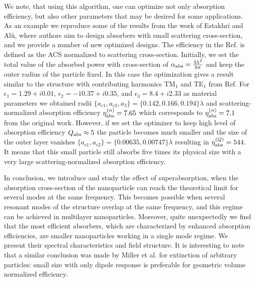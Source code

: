 \documentclass[twoside,twocolumn,9pt]{article}
\begin{document}
We note, that using this algorithm, one can optimize not
only absorption efficiency, but also other parameters that may be
desired for some applications. As an example we reproduce some of the
results from the work of Estakhri and Al\`u,\cite{Alu-2014} where
authors aim to design absorbers with small scattering cross-section,
and we provide a number of new optimized designs. The efficiency in
the Ref.\cite{Alu-2014} is defined as the ACS normalized to
scattering cross-section. Initially, we set the total value of the
absorbed power with cross-section of $\alpha_{\rm
  abs}=\frac{3\lambda^2}{8\pi}$ and keep the outer radius of the
particle fixed. In this case the optimization gives a result similar
to the structure with contributing harmonics TM${_1}$ and TE$_1$ from
Ref.\cite{Alu-2014}  For $\epsilon_1 = 1.29+i0.01$, $\epsilon_2 =
-10.37+ i0.35$, and $\epsilon_3=8.4+i2.33$ as material parameters we
obtained radii $\{a_{c1},a_{c2},a_3\}=\{0.142,0.166,0.194\}\lambda$
and scattering-normalized absorption efficiency $\eta_{\rm
  abs}^{(\alpha)} =7.65$ which corresponds to $\eta_{\rm
  abs}^{(\alpha)} =7.1$ from the original work.\cite{Alu-2014}
However, if we set the optimizer to keep high level of absorption
efficiency $Q_{\rm abs} \approx 5$ the particle becomes much smaller
and the size of the outer layer vanishes
$\{a_{c1},a_{c2}\}=\{0.00635,0.00747\}\lambda$ resulting in $\eta_{\rm
  abs}^{(Q)} =544$.  It means that this small particle still absorbs
five times its physical size with a very large scattering-normalized
absorption efficiency.



In conclusion, we introduce and study the effect of superabsorption,
when the absorption cross-section of the nanoparticle can reach the
theoretical limit for several modes at the same frequency. This
becomes possible when several resonant modes of the structure overlap
at the same frequency, and this regime can be achieved in multilayer
nanoparticles. Moreover, quite unexpectedly we find that the most
efficient absorbers, which are characterized by enhanced absorption
efficiencies, are smaller nanoparticles working in a single mode
regime. We present their spectral characteristics and field structure.
It is interesting to note that a similar conclusion was made by Miller
et al.\cite{Miller-2014} for extinction of arbitrary particles: small
size with only dipole response is preferable for geometric volume
normalized efficiency.
\end{document}
